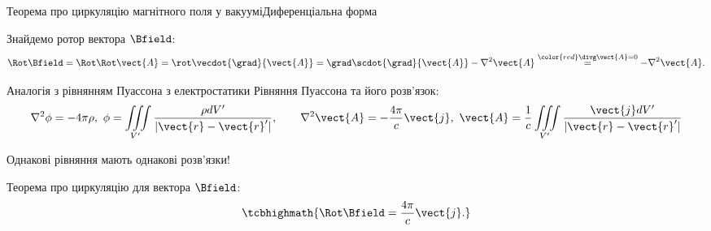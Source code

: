 \documentclass{beamer}
\begin{document}
\begin{frame}{Теорема про циркуляцію магнітного поля у вакуумі}{Диференціальна форма}
	\begin{block}{}
		Знайдемо ротор вектора $\Bfield$:
		\begin{equation*}
			\Rot\Bfield = \Rot\Rot\vect{A} = \rot\vecdot{\grad}{\vect{A}}  = \grad\scdot{\grad}{\vect{A}} - \nabla^2\vect{A}
			\stackrel{\color{red}\divg\vect{A}
				= 0}{=}  - \nabla^2\vect{A}.
		\end{equation*}
	\end{block}
	\begin{exampleblock}{\small Аналогія з рівнянням Пуассона з електростатики}\small
		Рівняння Пуассона та його розв'язок:
		\begin{equation*}
			\nabla^2\phi= -4\pi\rho,\ \phi = \iiint\limits_{V'} \frac{\rho dV'}{|\vect{r} - \vect{r}'|}, \qquad
			\nabla^2 \vect{A} = -\frac{4\pi}{c} \vect{j},\
			\vect{A} = \frac1c\iiint\limits_{V'} \frac{\vect{j} dV'}{|\vect{r} - \vect{r}'|}
		\end{equation*}
		\begin{center}
			\alert{Однакові рівняння мають однакові розв'язки!}
		\end{center}
	\end{exampleblock}
	\begin{block}{}\centering
		Теорема про циркуляцію для вектора $\Bfield$:
		\begin{equation*}
			\tcbhighmath{\Rot\Bfield = \frac{4\pi}c\vect{j}.}
		\end{equation*}
	\end{block}
\end{frame}
\end{document}
